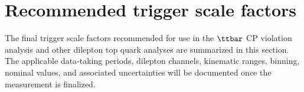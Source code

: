 \section{Recommended trigger scale factors}
\label{sec:recommendations}

The final trigger scale factors recommended for use in the $\ttbar$ CP violation analysis and other dilepton top quark analyses are summarized in this section. The applicable data-taking periods, dilepton channels, kinematic ranges, binning, nominal values, and associated uncertainties will be documented once the measurement is finalized.

